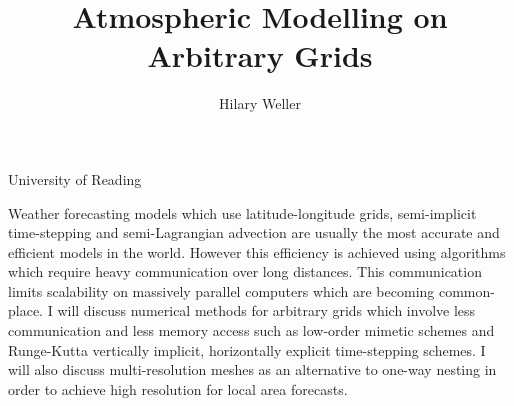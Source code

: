 \documentclass{article}
\begin{document}
\title{Atmospheric Modelling on Arbitrary Grids}

\author{Hilary Weller}{University of Reading}
\maketitle

Weather forecasting models which use latitude-longitude grids, semi-implicit time-stepping and semi-Lagrangian advection are usually the most accurate and efficient models in the world. However this efficiency is achieved using algorithms which require heavy communication over long distances. This communication limits scalability on massively parallel computers which are becoming common-place. I will discuss numerical methods for arbitrary grids which involve less communication and less memory access such as low-order mimetic schemes and Runge-Kutta vertically implicit, horizontally explicit time-stepping schemes. I will also discuss multi-resolution meshes as an alternative to one-way nesting in order to achieve high resolution for local area forecasts.
\end{document}
